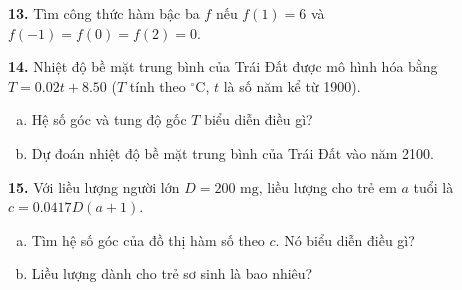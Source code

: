\begin{minipage}[t]{0.485\textwidth}
\noindent
\textbf{13.} Tìm công thức hàm bậc ba $f$ nếu $f(1) = 6$ và $f(-1) = f(0) = f(2) = 0$.

\vspace{1pt}
\noindent
\textbf{14.} Nhiệt độ bề mặt trung bình của Trái Đất được mô hình hóa bằng $T = 0.02t + 8.50$ ($T$ tính theo $^\circ\text{C}$, $t$ là số năm kể từ 1900).
\begin{enumerate}[(a),leftmargin=10pt,itemsep=0pt,topsep=1pt]
\item Hệ số góc và tung độ gốc $T$ biểu diễn điều gì?
\item Dự đoán nhiệt độ bề mặt trung bình của Trái Đất vào năm 2100.
\end{enumerate}

\vspace{1pt}
\noindent
\textbf{15.} Với liều lượng người lớn $D = 200\text{ mg}$, liều lượng cho trẻ em $a$ tuổi là $c = 0.0417D(a + 1)$.
\begin{enumerate}[(a),leftmargin=10pt,itemsep=0pt,topsep=1pt]
\item Tìm hệ số góc của đồ thị hàm số theo $c$. Nó biểu diễn điều gì?
\item Liều lượng dành cho trẻ sơ sinh là bao nhiêu?
\end{enumerate}
\end{minipage}